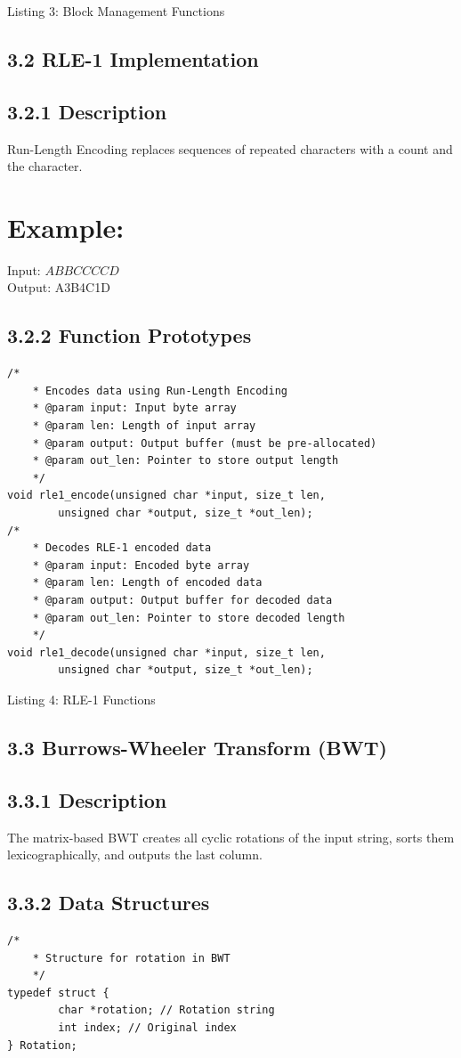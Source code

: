 \documentclass[10pt]{article}
\begin{document}
Listing 3: Block Management Functions

\subsection*{3.2 RLE-1 Implementation}
\subsection*{3.2.1 Description}
Run-Length Encoding replaces sequences of repeated characters with a count and the character.

\section*{Example:}
Input: $A B B C C C C D$\\
Output: A3B4C1D

\subsection*{3.2.2 Function Prototypes}
\begin{verbatim}
/*
    * Encodes data using Run-Length Encoding
    * @param input: Input byte array
    * @param len: Length of input array
    * @param output: Output buffer (must be pre-allocated)
    * @param out_len: Pointer to store output length
    */
void rle1_encode(unsigned char *input, size_t len,
        unsigned char *output, size_t *out_len);
/*
    * Decodes RLE-1 encoded data
    * @param input: Encoded byte array
    * @param len: Length of encoded data
    * @param output: Output buffer for decoded data
    * @param out_len: Pointer to store decoded length
    */
void rle1_decode(unsigned char *input, size_t len,
        unsigned char *output, size_t *out_len);
\end{verbatim}

Listing 4: RLE-1 Functions

\subsection*{3.3 Burrows-Wheeler Transform (BWT)}
\subsection*{3.3.1 Description}
The matrix-based BWT creates all cyclic rotations of the input string, sorts them lexicographically, and outputs the last column.

\subsection*{3.3.2 Data Structures}
\begin{verbatim}
/*
    * Structure for rotation in BWT
    */
typedef struct {
        char *rotation; // Rotation string
        int index; // Original index
} Rotation;
\end{verbatim}
\end{document}
